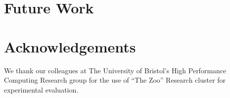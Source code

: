 \documentclass[sigconf,preprint,9pt]{acmart}
\begin{document}
\section{Future Work}

\section*{Acknowledgements}
We thank our colleagues at The University of Bristol's High Performance Computing Research group for the use of ``The Zoo'' Research cluster for experimental evaluation.





\newpage
\listoftodos[Notes]
\end{document}
